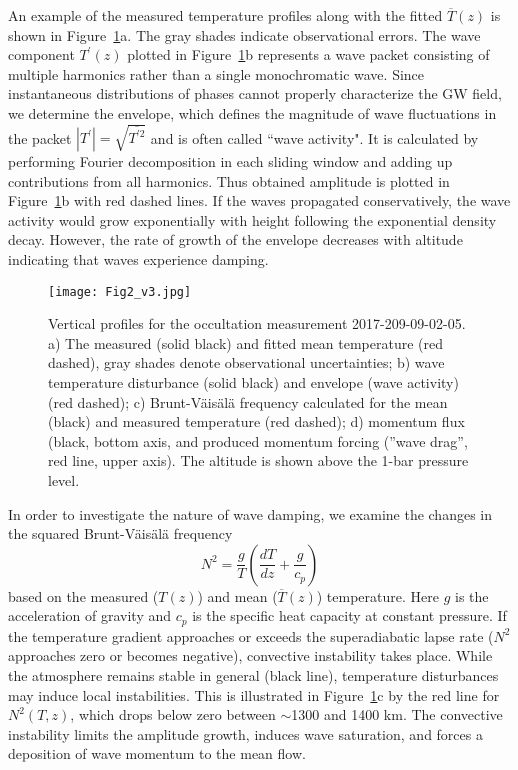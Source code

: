An example of the measured temperature profiles along with the fitted $\overline{T}(z)$ is shown in Figure~\ref{fig:Fig2}a. The gray shades indicate observational errors. The wave component $T^\prime(z)$ plotted in Figure~\ref{fig:Fig2}b represents a wave packet consisting of multiple harmonics rather than a single monochromatic wave. Since instantaneous distributions of phases cannot properly characterize the GW field, we determine the envelope, which defines the magnitude of wave fluctuations in the packet $|T^\prime| = \sqrt{\overline{T^{\prime 2}}}$ and is often called ``wave activity". It is calculated by performing Fourier decomposition in each sliding window and adding up contributions from all harmonics. Thus obtained amplitude is plotted in Figure~\ref{fig:Fig2}b with red dashed lines. If the waves propagated conservatively, the wave activity would grow exponentially with height following the exponential density decay. However, the rate of growth of the envelope decreases with altitude indicating that waves experience damping.
\begin{figure}
\noindent\texttt{[image: Fig2\_v3.jpg]}
\caption{Vertical profiles for the occultation measurement 2017-209-09-02-05. a) The measured (solid black) and fitted mean temperature (red dashed), gray shades denote observational uncertainties; b) wave temperature disturbance (solid black) and envelope (wave activity) (red dashed); c) Brunt-V\"ais\"al\"a frequency calculated for the mean (black) and measured temperature (red dashed); d) momentum flux (black, bottom axis, and produced momentum forcing (”wave drag”, red line, upper axis). The altitude is shown above the 1-bar pressure level.}
\label{fig:Fig2}
\end{figure}

In order to investigate the nature of wave damping, we examine the changes in  the squared Brunt-V\"ais\"al\"a frequency 
\begin{equation}
    N^2 = \frac{g}{T} \left(\frac{dT}{dz} + \frac{g}{c_p} \right)
    \label{eq:BVfreq}
\end{equation}
based on the measured ($T(z)$) and mean ($\overline{T}(z)$) temperature. Here $g$ is the acceleration of gravity and $c_p$ is the specific heat capacity at constant pressure. If the temperature gradient approaches or exceeds the superadiabatic lapse rate ($N^2$ approaches zero or becomes negative), convective instability takes place. While the atmosphere remains stable in general (black line), temperature disturbances may induce local instabilities. This is illustrated in Figure~\ref{fig:Fig2}c by the red line for $N^2(T,z)$, which drops below zero between $\sim$1300 and 1400 km. The convective instability limits the amplitude growth, induces wave saturation, and forces a deposition of wave momentum to the mean flow.

